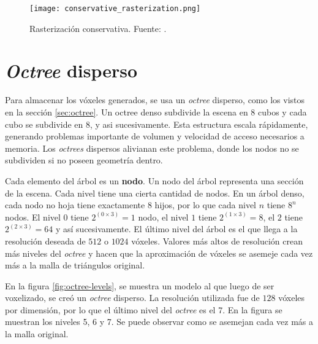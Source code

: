 \begin{figure}[h!]
    \centering
    \texttt{[image: conservative\_rasterization.png]}
    \caption{Rasterización conservativa. Fuente: \cite{opengl-insights}.}
    \label{fig:conservative_rasterization}
\end{figure}

\section{\textit{Octree} disperso}

Para almacenar los vóxeles generados, se usa un \textit{octree} disperso, como los vistos en la sección \ref{sec:octree}.
Un octree denso subdivide la escena en 8 cubos y cada cubo se subdivide en 8, y asi sucesivamente. Esta estructura escala rápidamente, generando problemas importante de volumen y velocidad de acceso necesarios a memoria.
Los \textit{octrees} dispersos alivianan este problema, donde los nodos no se subdividen si no poseen geometría dentro.

Cada elemento del árbol es un \textbf{nodo}.
Un nodo del árbol representa una sección de la escena.
Cada nivel tiene una cierta cantidad de nodos.
En un árbol denso, cada nodo no hoja tiene exactamente 8 hijos, por lo que cada nivel $n$ tiene $8^n$ nodos.
El nivel $0$ tiene $2^{(0\times 3)} = 1$ nodo, el nivel $1$ tiene $2^{(1\times 3)} = 8$, el $2$ tiene $2^{(2\times 3)} = 64$ y así sucesivamente. %
El último nivel del árbol es el que llega a la resolución deseada de $512$ o $1024$ vóxeles.
Valores más altos de resolución crean más niveles del \textit{octree} y hacen que la aproximación de vóxeles se asemeje cada vez más a la malla de triángulos original.

En la figura \ref{fig:octree-levels}, se muestra un modelo al que luego de ser voxelizado, se creó un \textit{octree} disperso.
La resolución utilizada fue de $128$ vóxeles por dimensión, por lo que el último nivel del \textit{octree} es el 7.
En la figura se muestran los niveles 5, 6 y 7.
Se puede observar como se asemejan cada vez más a la malla original.

